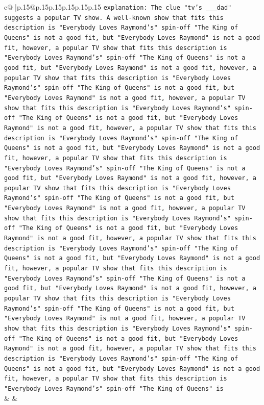 \documentclass{article}
\begin{document}
{\begin{supertabular}{c@{$\;$}|p{.15\linewidth}@{}p{.15\linewidth}p{.15\linewidth}p{.15\linewidth}p{.15\linewidth}p{.15\linewidth}}
{{{                \texttt{explanation: The clue "tv's \_\_\_dad" suggests a popular TV show. A well{-}known show that fits this description is "Everybody Loves Raymond's" spin{-}off "The King of Queens" is not a good fit, but "Everybody Loves Raymond" is not a good fit, however, a popular TV show that fits this description is "Everybody Loves Raymond's" spin{-}off "The King of Queens" is not a good fit, but "Everybody Loves Raymond" is not a good fit, however, a popular TV show that fits this description is "Everybody Loves Raymond's" spin{-}off "The King of Queens" is not a good fit, but "Everybody Loves Raymond" is not a good fit, however, a popular TV show that fits this description is "Everybody Loves Raymond's" spin{-}off "The King of Queens" is not a good fit, but "Everybody Loves Raymond" is not a good fit, however, a popular TV show that fits this description is "Everybody Loves Raymond's" spin{-}off "The King of Queens" is not a good fit, but "Everybody Loves Raymond" is not a good fit, however, a popular TV show that fits this description is "Everybody Loves Raymond's" spin{-}off "The King of Queens" is not a good fit, but "Everybody Loves Raymond" is not a good fit, however, a popular TV show that fits this description is "Everybody Loves Raymond's" spin{-}off "The King of Queens" is not a good fit, but "Everybody Loves Raymond" is not a good fit, however, a popular TV show that fits this description is "Everybody Loves Raymond's" spin{-}off "The King of Queens" is not a good fit, but "Everybody Loves Raymond" is not a good fit, however, a popular TV show that fits this description is "Everybody Loves Raymond's" spin{-}off "The King of Queens" is not a good fit, but "Everybody Loves Raymond" is not a good fit, however, a popular TV show that fits this description is "Everybody Loves Raymond's" spin{-}off "The King of Queens" is not a good fit, but "Everybody Loves Raymond" is not a good fit, however, a popular TV show that fits this description is "Everybody Loves Raymond's" spin{-}off "The King of Queens" is not a good fit, but "Everybody Loves Raymond" is not a good fit, however, a popular TV show that fits this description is "Everybody Loves Raymond's" spin{-}off "The King of Queens" is not a good fit, but "Everybody Loves Raymond" is not a good fit, however, a popular TV show that fits this description is "Everybody Loves Raymond's" spin{-}off "The King of Queens" is not a good fit, but "Everybody Loves Raymond" is not a good fit, however, a popular TV show that fits this description is "Everybody Loves Raymond's" spin{-}off "The King of Queens" is} \\
            }
        }
    }
    & & \\ \\


\end{supertabular}}
\end{document}
